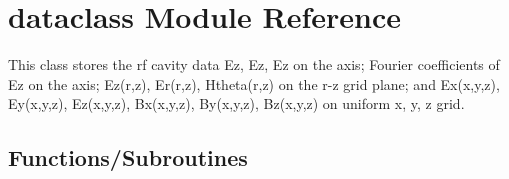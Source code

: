 \hypertarget{namespacedataclass}{}\section{dataclass Module Reference}
\label{namespacedataclass}


This class stores the rf cavity data Ez, Ez\textquotesingle{}, Ez\textquotesingle{}\textquotesingle{} on the axis; Fourier coefficients of Ez on the axis; Ez(r,z), Er(r,z), Htheta(r,z) on the r-\/z grid plane; and Ex(x,y,z), Ey(x,y,z), Ez(x,y,z), Bx(x,y,z), By(x,y,z), Bz(x,y,z) on uniform x, y, z grid.  


\subsection*{Functions/\+Subroutines}

